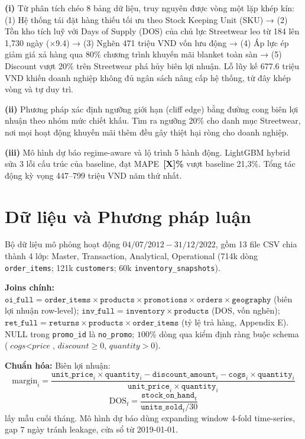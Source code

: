 \documentclass{article}
\begin{document}
\noindent\textbf{(i)} Từ phân tích chéo 8 bảng dữ liệu, truy nguyên được vòng một lặp khép kín: (1) Hệ thống tái đặt hàng thiếu tối ưu theo Stock Keeping Unit (SKU) → (2) Tồn kho tích luỹ với Days of Supply (DOS) của chủ lực Streetwear leo từ 184 lên 1,730 ngày (×9.4) → (3) Nghẽn 471 triệu VND vốn lưu động → (4) Áp lực ép giảm giá xả hàng qua 80\% chương trình khuyến mãi blanket toàn sàn → (5) Discount vượt 20\% trên Streetwear phá hủy biên lợi nhuận. Lỗ lũy kế 677.6 triệu VND khiến doanh nghiệp không đủ ngân sách nâng cấp hệ thống, từ đây khép vòng và tự duy trì.

\noindent\textbf{(ii)} Phương pháp xác định ngưỡng giới hạn (cliff edge)
bằng đường cong biên lợi nhuận theo nhóm mức chiết khấu. Tìm ra ngưỡng 20\% cho danh mục Streetwear, nơi mọi hoạt động khuyến mãi thêm đều gây thiệt hại ròng cho doanh nghiệp.

\noindent\textbf{(iii)} Mô hình dự báo regime-aware và lộ trình 5 hành động.
LightGBM hybrid sửa 3 lỗi cấu trúc của baseline, đạt MAPE~\textbf{[X]\%}
vượt baseline 21,3\%. Tổng tác động kỳ vọng 447--799 triệu VND năm thứ nhất.

\section{Dữ liệu và Phương pháp luận}
Bộ dữ liệu mô phỏng hoạt động $04/07/2012-31/12/2022$, gồm 13 file CSV chia
thành 4 lớp: Master, Transaction, Analytical, Operational (714k dòng
\texttt{order\_items}; 121k \texttt{customers}; 60k \texttt{inventory\_snapshots}).

\textbf{Joins chính:}
$\texttt{oi\_full} = \texttt{order\_items} \times \texttt{products} \times
\texttt{promotions} \times \texttt{orders} \times \texttt{geography}$ (biên
lợi nhuận row-level); $\texttt{inv\_full} = \texttt{inventory} \times
\texttt{products}$ (DOS, vốn nghẽn); $\texttt{ret\_full}=\texttt{returns}\times\texttt{products}\times\texttt{order\_items}$ (tỷ lệ trả hàng, Appendix E). NULL trong \texttt{promo\_id} là
\texttt{no\_promo}; $100$\% dòng qua kiểm định ràng buộc schema ($\textit{cogs}
< \textit{price}$, $\textit{discount} \ge 0$, $\textit{quantity} > 0$).

\textbf{Chuẩn hóa:} Biên lợi nhuận:
\[
\mathrm{margin}_i = \frac{\texttt{unit\_price}_i\times \texttt{quantity}_i - \texttt{discount\_amount}_i - \texttt{cogs}_i\times \texttt{quantity}_i}{\texttt{unit\_price}_i\times \texttt{quantity}_i}
\]
\[
\mathrm{DOS}_t = \frac{\texttt{stock\_on\_hand}_t}{\texttt{units\_sold}_t/30}
\]
lấy mẫu cuối tháng. Mô hình dự báo dùng expanding window 4-fold time-series,
gap 7 ngày tránh leakage, cửa sổ từ 2019-01-01.
\end{document}
